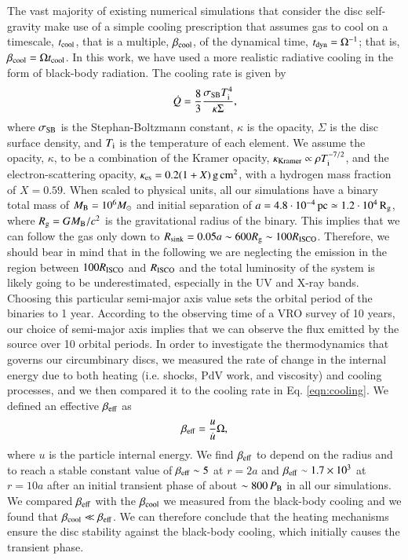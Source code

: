 \documentclass{aa}
\begin{document}
The vast majority of existing numerical simulations that consider the disc self-gravity \citep{Gammie2001, Lodatorice2005,Cuadra2009,roedig2014,Franchini2021} make use of a simple cooling prescription that assumes gas to cool on a timescale, $t_{\rm cool}$, that is a multiple, $\beta_{\rm cool}$, of the dynamical time, $t_{\rm dyn}=\Omega^{-1}$; that is, $\beta_{\rm cool} = \Omega t_{\rm cool}$. 
In this work, we have used a more realistic radiative cooling in the form of black-body radiation. The cooling rate is given by
\begin{equation}
        \label{eqn:cooling}
        \dot Q = \frac{8}{3} \frac{\sigma_{\rm SB} T_{\rm i}^4}{\kappa \Sigma}
,\end{equation}
where $\sigma_{\rm SB}$ is the Stephan-Boltzmann constant, $\kappa$ is the opacity, $\Sigma$ is the disc surface density, and $ T_{\rm i} $ is the temperature of each element.
We assume the opacity, $\kappa$, to be a combination of the Kramer opacity, $ \kappa_{\rm Kramer} \propto \rho T_{\rm i} ^{-7/2} $, and the electron-scattering opacity, $ \kappa_{\rm es} = 0.2 (1+X) \, \mbox{g}\, \mbox{cm}^2$, with a hydrogen mass fraction of $ X=0.59$.
When scaled to physical units, all our simulations have a binary total mass of $M_{\rm B}= 10^6 M_{\odot}$ and initial separation of
$a=4.8 \cdot 10^{-4} \, \rm{pc} \simeq 1.2 \cdot 10^4 \, R_{\rm g}$, where $R_{\rm g} = GM_{\rm B}/c^2$ is the gravitational radius of the binary. This implies that we can follow the gas only down to $R_{\rm sink}=0.05a \sim 600 R_{\rm g} \sim 100 R_{\rm ISCO}$. Therefore, we should bear in mind that in the following we are neglecting the emission in the region between $100 R_{\rm ISCO}$ and $R_{\rm ISCO}$ and the total luminosity of the system is likely going to be underestimated, especially in the UV and X-ray bands.
Choosing this particular semi-major axis value sets the orbital period of the binaries to 1 year. According to the observing time of a VRO survey of 10 years, our choice of semi-major axis implies that we can observe the flux emitted by the source over 10 orbital periods. 
In order to investigate the thermodynamics that governs our circumbinary discs, we measured the rate of change in the internal energy due to both heating (i.e. shocks, PdV work, and viscosity) and cooling processes, and we then compared it to the cooling rate in Eq. \ref{eqn:cooling}.
We defined an effective $\beta_{\rm eff}$ as
\begin{equation}
  \label{eqn:betaeff}
  \beta_{\rm eff} = \frac{u}{\dot u} \Omega
,\end{equation}
where $u$ is the particle internal energy. 
We find $\beta_{\rm eff}$ to depend on the radius and to reach a stable constant value of $\beta_{\rm eff} \sim 5$ at $r=2a$ and $\beta_{\rm eff} \sim 1.7 \times 10^{3}$ at $r=10a$ after an initial transient phase of about $\sim 800 \, P_{\rm B}$ in all our simulations. We compared $\beta_{\rm eff}$ with the $\beta_{\rm cool}$ we measured from the black-body cooling and we found that $\beta_{\rm cool} \ll \beta_{\rm eff}$. We can therefore conclude that the heating mechanisms ensure the disc stability against the black-body cooling, which initially causes the transient phase.
\end{document}
